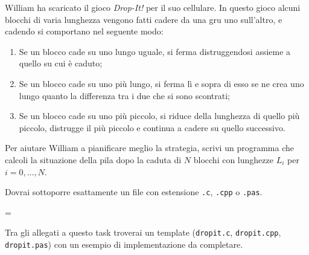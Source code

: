 \usepackage{xcolor}
\usepackage{afterpage}
\usepackage{pifont,mdframed}
\usepackage[bottom]{footmisc}

\makeatletter
\gdef\this@inputfilename{input.txt}
\gdef\this@outputfilename{output.txt}
\makeatother

\newcommand{\inputfile}{\texttt{input.txt}}
\newcommand{\outputfile}{\texttt{output.txt}}

\newenvironment{warning}
  {\par\begin{mdframed}[linewidth=2pt,linecolor=gray]%
    \begin{list}{}{\leftmargin=1cm
                   \labelwidth=\leftmargin}\item[\Large\ding{43}]}
  {\end{list}\end{mdframed}\par}

	William ha scaricato il gioco \emph{Drop-It!} per il suo cellulare. In questo gioco alcuni blocchi di varia lunghezza vengono fatti cadere da una gru uno sull'altro, e cadendo si comportano nel seguente modo:
	\begin{enumerate}
		\item Se un blocco cade su uno lungo uguale, si ferma distruggendosi assieme a quello su cui è caduto;
		\item Se un blocco cade su uno pi\`u lungo, si ferma l\`i e sopra di esso se ne crea uno lungo quanto la differenza tra i due che si sono scontrati;
		\item Se un blocco cade su uno pi\`u piccolo, si riduce della lunghezza di quello pi\`u piccolo, distrugge il pi\`u piccolo e continua a cadere su quello successivo.
	\end{enumerate}
	Per aiutare William a pianificare meglio la strategia, scrivi un programma che calcoli la situazione della pila dopo la caduta di $N$ blocchi con lunghezze $L_i$ per $i=0, \ldots, N$.

\Implementation
Dovrai sottoporre esattamente un file con estensione \texttt{.c}, \texttt{.cpp} o \texttt{.pas}.

\begin{warning}
Tra gli allegati a questo task troverai un template (\texttt{dropit.c}, \texttt{dropit.cpp}, \texttt{dropit.pas}) con un esempio di implementazione da completare.
\end{warning}

